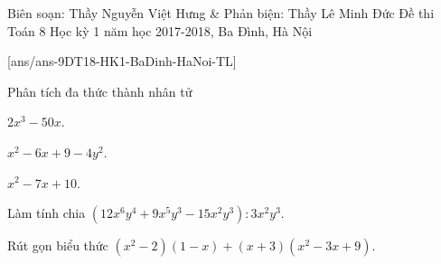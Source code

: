 \begin{name}
{Biên soạn: Thầy Nguyễn Việt Hưng \& Phản biện: Thầy Lê Minh Đức}
{Đề thi Toán 8 Học kỳ 1 năm học 2017-2018, Ba Đình, Hà Nội }
\end{name}
\setcounter{bt}{0}
[ans/ans-9DT18-HK1-BaDinh-HaNoi-TL]
\begin{bt}%
	Phân tích đa thức thành nhân tử
	\begin{listEX}[3]
		\item $2x^3-50x$.
		\item $x^2-6x+9-4y^2$.
		\item $x^2-7x+10$.
	\end{listEX}
\end{bt}
\begin{bt}%
	Làm tính chia $(12x^6y^4+9x^5y^3-15x^2y^3):3x^2y^3$.
\end{bt}
\begin{bt}%
	Rút gọn biểu thức $(x^2-2)(1-x)+(x+3)(x^2-3x+9)$.
\end{bt}
